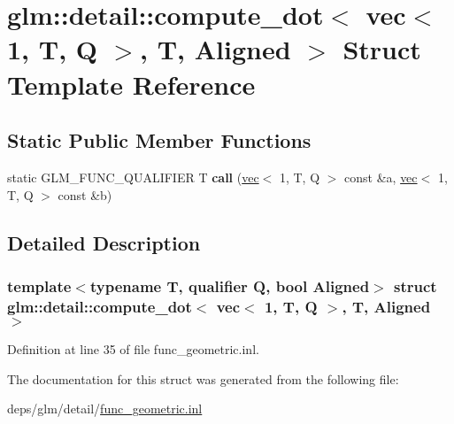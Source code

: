 \hypertarget{structglm_1_1detail_1_1compute__dot_3_01vec_3_011_00_01T_00_01Q_01_4_00_01T_00_01Aligned_01_4}{}\section{glm\+:\+:detail\+:\+:compute\+\_\+dot$<$ vec$<$ 1, T, Q $>$, T, Aligned $>$ Struct Template Reference}
\label{structglm_1_1detail_1_1compute__dot_3_01vec_3_011_00_01T_00_01Q_01_4_00_01T_00_01Aligned_01_4}
\subsection*{Static Public Member Functions}
\begin{DoxyCompactItemize}
\item 
\mbox{\label{structglm_1_1detail_1_1compute__dot_3_01vec_3_011_00_01T_00_01Q_01_4_00_01T_00_01Aligned_01_4_ae4911d1dd9eddcd2813e2935b0f327fc}} 
static G\+L\+M\+\_\+\+F\+U\+N\+C\+\_\+\+Q\+U\+A\+L\+I\+F\+I\+ER T {\bfseries call} (\hyperlink{structglm_1_1vec}{vec}$<$ 1, T, Q $>$ const \&a, \hyperlink{structglm_1_1vec}{vec}$<$ 1, T, Q $>$ const \&b)
\end{DoxyCompactItemize}


\subsection{Detailed Description}
\subsubsection*{template$<$typename T, qualifier Q, bool Aligned$>$\newline
struct glm\+::detail\+::compute\+\_\+dot$<$ vec$<$ 1, T, Q $>$, T, Aligned $>$}



Definition at line 35 of file func\+\_\+geometric.\+inl.



The documentation for this struct was generated from the following file\+:\begin{DoxyCompactItemize}
\item 
deps/glm/detail/\hyperlink{func__geometric_8inl}{func\+\_\+geometric.\+inl}\end{DoxyCompactItemize}
